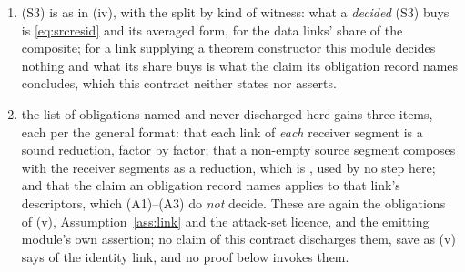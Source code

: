 \begin{theorem}
\begin{enumerate}[label=(\roman*$'$),leftmargin=2.6em]
family --- are data of no one. The consistency reading holds under the same
hypothesis read per factor: if every factor's supplied channel data are trace
preserving, so that each $\Lambda_f^{\dagger}$ is unital, then so is
$\Lambda^{\dagger}$ and summing \eqref{eq:pullback-product} over $v$ returns
completeness of the product physical family and nothing more. That trace
preservation is Assumption~\ref{ass:link}, per factor, and is evaluated
nowhere.
\item (S3) is as in (iv), with the split by kind of witness: what a
\emph{decided} (S3) buys is \eqref{eq:srcresid} and its averaged form, for the
data links' share of the composite; for a link supplying a theorem constructor
this module decides nothing and what its share buys is what the claim its
obligation record names concludes, which this contract neither states nor
asserts.
\item the list of obligations named and never discharged here gains three
items, each per the general format: that each link of \emph{each} receiver
segment is a sound reduction, factor by factor; that a non-empty source
segment composes with the receiver segments as a reduction, which is
, used by no step here; and that the claim an
obligation record names applies to that link's descriptors, which (A1)--(A3)
do \emph{not} decide. These are again the obligations of (v),
Assumption~\ref{ass:link} and the attack-set licence, and the emitting
module's own assertion; no claim of this contract discharges them, save as (v) says of
the  identity link, and no proof below invokes them.
\end{enumerate}
\end{theorem}

